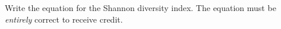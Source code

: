 \bonusquestion[2]
Write the equation for the Shannon diversity index. The equation must be \emph{entirely} correct to receive credit.

